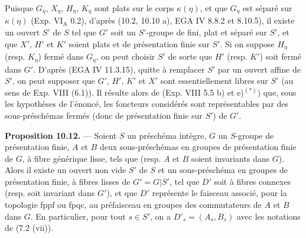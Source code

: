 \documentclass[11pt,a4paper]{article}
\begin{document}
Puisque $G_{\eta}$, $X_{\eta}$, $H_{\eta}$, $K_{\eta}$ sont plats sur le
corps $\kappa(\eta)$, et que
$G_{\eta}$ est séparé sur $\kappa(\eta)$ (Exp. VI$_{\mathrm{A}}$ 0.2),
d'après (10.2, 10.10 a), EGA IV 8.8.2 et 8.10.5), il existe un ouvert
 $S'$ de $S$ tel que $G'$ soit un $S'$-groupe de 
 fini, plat et séparé sur $S'$, et que $X'$, $H'$
et $K'$ soient plats et de présentation finie sur $S'$. Si on suppose
$H_{\eta}$ (resp. $K_{\eta}$) fermé dans $G_{\eta}$, on peut choisir $S'$
de sorte que $H'$ (resp. $K'$) soit fermé dans $G'$. D'après (EGA IV
11.3.15), quitte à remplacer $S'$ par un ouvert affine de $S'$, on peut
supposer que $G'$, $H'$, $K'$ et $X'$ sont essentiellement libres sur $S'$
(au sens de Exp. VIII (6.1)). Il résulte alors de (Exp. VIII 5.5 b) et
e)$^{(*)}$) que, sous les hypothèses de l'énoncé, les foncteurs considérés
sont représentables par des sous-préschémas fermés (donc de présentation
finie sur $S'$) de $G'$.

\textbf{Proposition 10.12.} — Soient $S$ un préschéma intègre, $G$ un
\struck{\ill{}} $S$-groupe de présentation finie, $A$ et $B$ deux
sous-préschémas en groupes de présentation finie de $G$, à fibre
générique lisse, tels que \struck{\ill{}}  (resp. \struck{\ill{}} $A$ et $B$ soient invariants dans $G$).
Alors il existe un ouvert non vide $S'$ de $S$ et un sous-préschéma en
groupes  de présentation finie, à fibres lisses
 de $G' = G|S'$, tel que $D'$ soit \struck{\ill{}} à
fibres connexes (resp. soit invariant dans $G'$), et que $D'$ représente
le faisceau associé, pour la topologie fppf ou fpqc, au préfaisceau en
groupes des commutateurs de $A$ et $B$ dans $G$. En particulier, pour tout
$s \in S'$, on a $D'_{s} = (A_{s}, B_{s})$ avec les notations de (7.2
(vii)).
\end{document}
